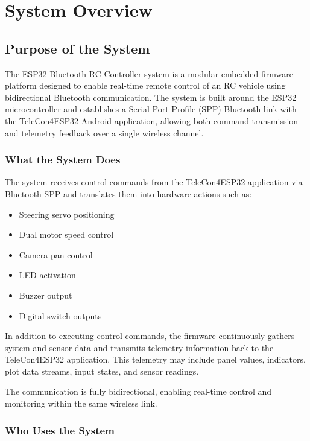 

\chapter{System Overview}

\section{Purpose of the System}

The ESP32 Bluetooth RC Controller system is a modular embedded firmware platform designed to enable real-time remote control of an RC vehicle using bidirectional Bluetooth communication. The system is built around the ESP32 microcontroller and establishes a Serial Port Profile (SPP) Bluetooth link with the TeleCon4ESP32 Android application, allowing both command transmission and telemetry feedback over a single wireless channel.

\subsection{What the System Does}

The system receives control commands from the TeleCon4ESP32 application via Bluetooth SPP and translates them into hardware actions such as:

\begin{itemize}
	\item Steering servo positioning
	\item Dual motor speed control
	\item Camera pan control
	\item LED activation
	\item Buzzer output
	\item Digital switch outputs
\end{itemize}

In addition to executing control commands, the firmware continuously gathers system and sensor data and transmits telemetry information back to the TeleCon4ESP32 application. This telemetry may include panel values, indicators, plot data streams, input states, and sensor readings.

The communication is fully bidirectional, enabling real-time control and monitoring within the same wireless link.

\subsection{Who Uses the System}

